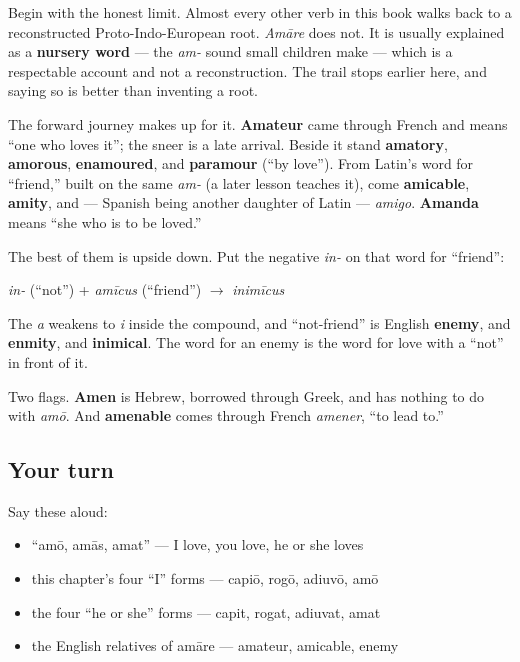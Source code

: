 \begin{cousinweb}
Begin with the honest limit. Almost every other verb in this book walks back to a reconstructed Proto-Indo-European root. \emph{Amāre} does not. It is usually explained as a \textbf{nursery word} — the \emph{am-} sound small children make — which is a respectable account and not a reconstruction. The trail stops earlier here, and saying so is better than inventing a root.

The forward journey makes up for it. \textbf{Amateur} came through French and means \textquotedblleft{}one who loves it\textquotedblright{}; the sneer is a late arrival. Beside it stand \textbf{amatory}, \textbf{amorous}, \textbf{enamoured}, and \textbf{paramour} (\textquotedblleft{}by love\textquotedblright{}). From Latin's word for \textquotedblleft{}friend,\textquotedblright{} built on the same \emph{am-} (a later lesson teaches it), come \textbf{amicable}, \textbf{amity}, and — Spanish being another daughter of Latin — \emph{amigo}. \textbf{Amanda} means \textquotedblleft{}she who is to be loved.\textquotedblright{}

The best of them is upside down. Put the negative \emph{in-} on that word for \textquotedblleft{}friend\textquotedblright{}:

\emph{in-} (\textquotedblleft{}not\textquotedblright{}) + \emph{amīcus} (\textquotedblleft{}friend\textquotedblright{}) $\to$ \emph{inimīcus}

The \emph{a} weakens to \emph{i} inside the compound, and \textquotedblleft{}not-friend\textquotedblright{} is English \textbf{enemy}, and \textbf{enmity}, and \textbf{inimical}. The word for an enemy is the word for love with a \textquotedblleft{}not\textquotedblright{} in front of it.

Two flags. \textbf{Amen} is Hebrew, borrowed through Greek, and has nothing to do with \emph{amō}. And \textbf{amenable} comes through French \emph{amener}, \textquotedblleft{}to lead to.\textquotedblright{}
\end{cousinweb}

\subsection*{Your turn}
Say these aloud:

\begin{itemize}
\raggedright
  \item \textquotedblleft{}amō, amās, amat\textquotedblright{} — I love, you love, he or she loves
  \item this chapter's four \textquotedblleft{}I\textquotedblright{} forms — capiō, rogō, adiuvō, amō
  \item the four \textquotedblleft{}he or she\textquotedblright{} forms — capit, rogat, adiuvat, amat
  \item the English relatives of amāre — amateur, amicable, enemy
\end{itemize}

